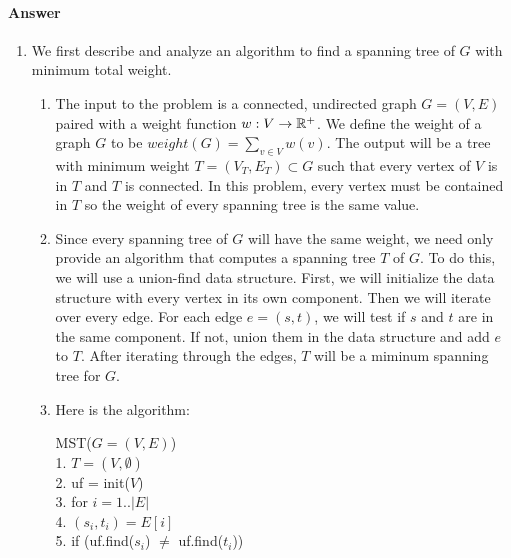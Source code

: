 \documentclass{article}
\begin{document}
\paragraph{Answer}

\begin{enumerate}[label=(\alph*)]
    \item We first describe and analyze an algorithm to find a spanning tree of $G$ with minimum total weight.
        \begin{enumerate}[label=\alph*)]
            \item The input to the problem is a connected, undirected graph $G = (V, E)$ paired with a weight function $w: V \rightarrow {\mathbb R} ^+$.
            We define the weight of a graph $G$ to be $weight(G) = \sum _{v \in V} w(v)$. \parspace
            The output will be a tree with minimum weight $T = (V_T, E_T) \subset G$ such that every vertex of $V$ is in $T$ and $T$ is connected.
            In this problem, every vertex must be contained in $T$ so the weight of every spanning tree is the same value.
            \item Since every spanning tree of $G$ will have the same weight, we need only provide an algorithm that computes a spanning tree $T$ of $G$.
            To do this, we will use a union-find data structure.
            First, we will initialize the data structure with every vertex in its own component.
            Then we will iterate over every edge.
            For each edge $e = (s, t)$, we will test if $s$ and $t$ are in the same component.
            If not, union them in the data structure and add $e$ to $T$.
            After iterating through the edges, $T$ will be a miminum spanning tree for $G$.
            \item Here is the algorithm:
            \begin{algorithm}
                \textsc{MST}($G = (V, E)$) \\
                1. \hspace{1em} $T = (V, \emptyset)$ \\
                2. \hspace{1em} uf = init($V$) \\
                3. \hspace{1em} for $i=1..|E|$ \\
                4. \hspace{2em}     $(s_i, t_i) = E[i]$ \\
                5. \hspace{2em}     if (uf.find($s_i$) $\neq$ uf.find($t_i$)) \\

\end{algorithm}
\end{enumerate}
\end{enumerate}
\end{document}
